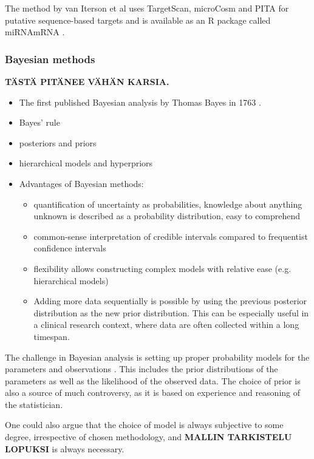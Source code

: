 The method by van Iterson et al uses TargetScan, microCosm and PITA for
putative sequence-based targets and is available as an R package called
miRNAmRNA \citep{vanItersonWeb}.








\subsubsection{Bayesian methods}\label{bayesian-methods}

\textbf{TÄSTÄ PITÄNEE VÄHÄN KARSIA.}

\begin{itemize}
  \item The first published Bayesian analysis by Thomas Bayes in 1763 \citep{Gelman2013}.
  \item Bayes' rule
  \item posteriors and priors
  \item hierarchical models and hyperpriors
  \item Advantages of Bayesian methods:
  \begin{itemize}
    \item
    quantification of uncertainty as probabilities, knowledge about anything
    unknown is described as a probability distribution, easy to comprehend
    \item
    common-sense interpretation of credible intervals compared to frequentist
    confidence intervals
    \item
    flexibility allows constructing complex models with relative ease (e.g.
    hierarchical models)
    \item
    Adding more data sequentially is possible by using the previous posterior
    distribution as the new prior distribution. This can be especially useful in
    a clinical research context, where data are often collected within a long
    timespan.
  \end{itemize}
\end{itemize}
The challenge in Bayesian analysis is setting up proper probability models for
the parameters and observations \citep{Gelman2013}. This includes the prior
distributions of the parameters as well as the likelihood of the observed data.
The choice of prior is also a source of much controversy, as it is based
on experience and reasoning of the statistician.

One could also argue that the choice of model is always subjective to some
degree, irrespective of chosen methodology, and \textbf{MALLIN TARKISTELU
LOPUKSI} is always necessary.


